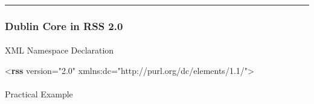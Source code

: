 \documentclass[
  letterpaper,
  DIV=11,
  numbers=noendperiod]{scrartcl}
\makeatletter
\let\oldparagraph\paragraph
\renewcommand{\paragraph}{
    \@ifstar
      \xxxParagraphStar
      \xxxParagraphNoStar
  }
\newcommand{\xxxParagraphStar}[1]{\oldparagraph*{#1}\mbox{}}
\newcommand{\xxxParagraphNoStar}[1]{\oldparagraph{#1}\mbox{}}
\newenvironment{Shaded}{\begin{snugshade}}{\end{snugshade}}
\newcommand{\KeywordTok}[1]{\textcolor[rgb]{0.00,0.23,0.31}{\textbf{#1}}}
\newcommand{\NormalTok}[1]{\textcolor[rgb]{0.00,0.23,0.31}{#1}}
\newcommand{\OtherTok}[1]{\textcolor[rgb]{0.00,0.23,0.31}{#1}}
\newcommand{\StringTok}[1]{\textcolor[rgb]{0.13,0.47,0.30}{#1}}
\makeatother
\begin{document}
\begin{center}\rule{0.5\linewidth}{0.5pt}\end{center}

\subsubsection{Dublin Core in RSS 2.0}\label{dublin-core-in-rss-2.0}

\paragraph{XML Namespace Declaration}\label{xml-namespace-declaration}

\begin{Shaded}
\begin{Highlighting}[]
\NormalTok{\textless{}}\KeywordTok{rss}\OtherTok{ version=}\StringTok{"2.0"}\OtherTok{ xmlns:dc=}\StringTok{"http://purl.org/dc/elements/1.1/"}\NormalTok{\textgreater{}}
\end{Highlighting}
\end{Shaded}

\paragraph{Practical Example}\label{practical-example}
\end{document}
